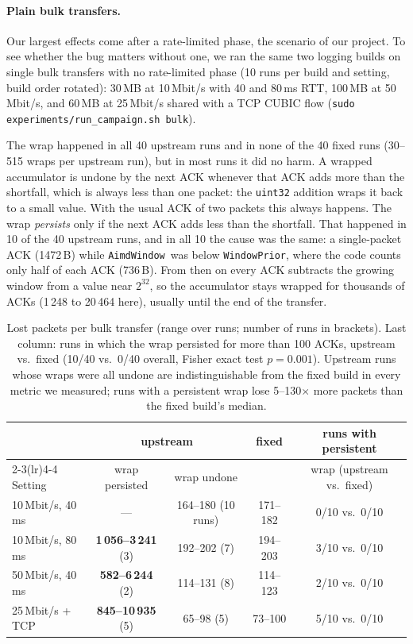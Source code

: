 \documentclass[11pt,a4paper]{article}
\newcommand{\aw}{\texttt{AimdWindow}}
\begin{document}
\paragraph{Plain bulk transfers.}\label{sec:bulk}
Our largest effects come after a rate-limited phase, the scenario of our
project. To see whether the bug matters without one, we ran the same two
logging builds on single bulk transfers with no rate-limited phase (10 runs
per build and setting, build order rotated): 30\,MB at 10\,Mbit/s with 40 and
80\,ms RTT, 100\,MB at 50\,Mbit/s, and 60\,MB at 25\,Mbit/s shared with a
TCP CUBIC flow (\texttt{sudo experiments/run\_campaign.sh bulk}).

The wrap happened in all 40 upstream runs and in
none of the 40 fixed runs (30--515 wraps per upstream run), but in most runs
it did no harm. A wrapped
accumulator is undone by the next ACK whenever that ACK adds more than the
shortfall, which is always less than one packet: the \texttt{uint32} addition
wraps it back to a small value. With the usual ACK of two packets this always
happens. The wrap \emph{persists} only if the next ACK adds less than the
shortfall. That happened in 10 of the 40 upstream runs, and in all 10 the
cause was the same: a single-packet ACK (1472\,B) while \aw\ was below
\texttt{WindowPrior}, where the code counts only half of each ACK (736\,B).
From then on every ACK subtracts the growing window from a value near
$2^{32}$, so the accumulator stays wrapped for thousands of ACKs (1\,248 to
20\,464 here), usually until the end of the transfer.

\begin{table}[H]
\centering\footnotesize
\setlength{\tabcolsep}{3.5pt}
\begin{tabular}{@{}lcccc@{}}
\toprule
 & \multicolumn{2}{c}{upstream} & fixed & runs with persistent \\
\cmidrule(lr){2-3}\cmidrule(lr){4-4}
Setting & wrap persisted & wrap undone & & wrap (upstream vs.\ fixed) \\
\midrule
10\,Mbit/s, 40\,ms & --- & 164--180 (10 runs) & 171--182 & 0/10 vs.\ 0/10 \\
10\,Mbit/s, 80\,ms & \textbf{1\,056--3\,241} (3) & 192--202 (7) & 194--203 & 3/10 vs.\ 0/10 \\
50\,Mbit/s, 40\,ms & \textbf{582--6\,244} (2) & 114--131 (8) & 114--123 & 2/10 vs.\ 0/10 \\
25\,Mbit/s + TCP & \textbf{845--10\,935} (5) & 65--98 (5) & 73--100 & 5/10 vs.\ 0/10 \\
\bottomrule
\end{tabular}
\caption{Lost packets per bulk transfer (range over runs; number of runs in
  brackets). Last column: runs in which the wrap persisted for more than 100
  ACKs, upstream vs.\ fixed (10/40 vs.\ 0/40 overall, Fisher exact test
  $p = 0.001$). Upstream runs whose wraps were all undone are
  indistinguishable from the fixed build in every metric we measured; runs
  with a persistent wrap lose 5--130$\times$ more packets than the fixed
  build's median.}
\label{tab:bulk}
\end{table}
\end{document}
